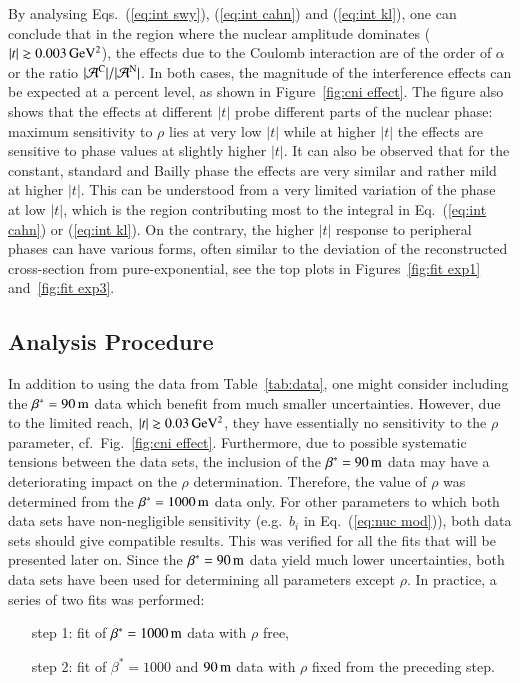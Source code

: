 By analysing Eqs.~(\ref{eq:int swy}), (\ref{eq:int cahn}) and (\ref{eq:int kl}), one can conclude that in the region where the nuclear amplitude dominates ($|t| \gtrsim 0.003\,{\rm GeV^2}$), the effects due to the Coulomb interaction are of the order of $\alpha$ or the ratio $|{\cal A}^{\rm C}| / |{\cal A}^{\rm N}|$. In both cases, the magnitude of the interference effects can be expected at a percent level, as shown in Figure~\ref{fig:cni effect}. The figure also shows that the effects at different $|t|$ probe different parts of the nuclear phase: maximum sensitivity to $\rho$ lies at very low $|t|$ while at higher $|t|$ the effects are sensitive to phase values at slightly higher $|t|$. It can also be observed that for the constant, standard and Bailly phase the effects are very similar and rather mild at higher $|t|$. This can be understood from a very limited variation of the phase at low $|t|$, which is the region contributing most to the integral in Eq.~(\ref{eq:int cahn}) or (\ref{eq:int kl}). On the contrary, the higher $|t|$ response to peripheral phases can have various forms, often similar to the deviation of the reconstructed cross-section from pure-exponential, see the top plots in Figures~\ref{fig:fit exp1} and~\ref{fig:fit exp3}.


\subsection{Analysis Procedure}
\label{sec:cni anal proc}

In addition to using the data from Table~\ref{tab:data}, one might consider including the $\beta^* = 90\,{\rm m}$ data \cite{8tev-90m} which benefit from much smaller uncertainties. However, due to the limited reach, $|t| \gtrsim 0.03\,{\rm GeV^2}$, they have essentially no sensitivity to the $\rho$ parameter, cf.~Fig.~\ref{fig:cni effect}. Furthermore, due to possible systematic tensions between the data sets, the inclusion of the $\beta^* = 90\,{\rm m}$ data may have a deteriorating impact on the $\rho$ determination. Therefore, the value of $\rho$ was determined from the $\beta^* = 1000\,{\rm m}$ data only. For other parameters to which both data sets have non-negligible sensitivity (e.g.~$b_i$ in Eq.~(\ref{eq:nuc mod})), both data sets should give compatible results. This was verified for all the fits that will be presented later on. Since the $\beta^* = 90\,{\rm m}$ data yield much lower uncertainties, both data sets have been used for determining all parameters except $\rho$. In practice, a series of two fits was performed:
\begin{enumerate}[leftmargin=2cm]
\item[step 1:] fit of $\beta^* = 1000\,{\rm m}$ data with $\rho$ free,
\item[step 2:] fit of $\beta^* = 1000$ and $90\,{\rm m}$ data with $\rho$ fixed from the preceding step.
\end{enumerate}

